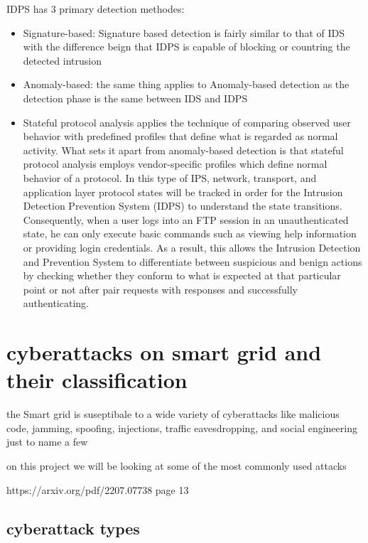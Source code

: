 IDPS has 3 primary detection methodes:


\begin{itemize}
	\item Signature-based: Signature based detection is fairly similar to that of IDS with the difference beign that IDPS is capable of blocking or countring the detected intrusion
	\item Anomaly-based: the same thing applies to Anomaly-based detection as the detection phase is the same between IDS and IDPS
	\item Stateful protocol analysis applies the technique of comparing observed user behavior with predefined profiles that define what is regarded as normal activity. What sets it apart from anomaly-based detection is that stateful protocol analysis employs vendor-specific profiles which define normal behavior of a protocol. In this type of IPS, network, transport, and application layer protocol states will be tracked in order for the Intrusion Detection Prevention System (IDPS) to understand the state transitions. Consequently, when a user logs into an FTP session in an unauthenticated state, he can only execute basic commands such as viewing help information or providing login credentials. As a result, this allows the Intrusion Detection and Prevention System to differentiate between suspicious and benign actions by checking whether they conform to what is expected at that particular point or not after pair requests with responses and successfully authenticating. \cite{NIST-IDPS19-20}
	

\end{itemize}









\section{cyberattacks on smart grid and their classification}
the Smart grid is suseptibale to a wide variety of cyberattacks like malicious code, jamming, spoofing, injections, traffic eavesdropping, and social engineering just to name a few

on this project we will be looking at some of the most commonly used attacks

https://arxiv.org/pdf/2207.07738 page 13
\subsection{cyberattack types}
